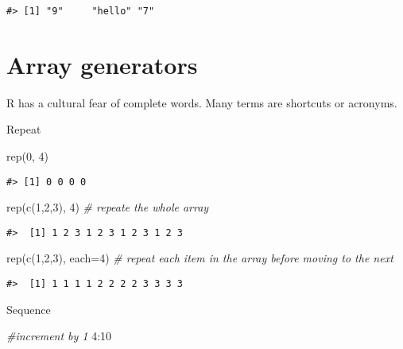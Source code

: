\documentclass[
]{book}
\newenvironment{Shaded}{\begin{snugshade}}{\end{snugshade}}
\newcommand{\AttributeTok}[1]{\textcolor[rgb]{0.77,0.63,0.00}{#1}}
\newcommand{\CommentTok}[1]{\textcolor[rgb]{0.56,0.35,0.01}{\textit{#1}}}
\newcommand{\DecValTok}[1]{\textcolor[rgb]{0.00,0.00,0.81}{#1}}
\newcommand{\FunctionTok}[1]{\textcolor[rgb]{0.00,0.00,0.00}{#1}}
\newcommand{\NormalTok}[1]{#1}
\newcommand{\SpecialCharTok}[1]{\textcolor[rgb]{0.00,0.00,0.00}{#1}}
\begin{document}
\begin{verbatim}
#> [1] "9"     "hello" "7"
\end{verbatim}

\hypertarget{array-generators}{%
\section{Array generators}\label{array-generators}}

R has a cultural fear of complete words. Many terms are shortcuts or acronyms.

Repeat

\begin{Shaded}
\begin{Highlighting}[]
\FunctionTok{rep}\NormalTok{(}\DecValTok{0}\NormalTok{, }\DecValTok{4}\NormalTok{)}
\end{Highlighting}
\end{Shaded}

\begin{verbatim}
#> [1] 0 0 0 0
\end{verbatim}

\begin{Shaded}
\begin{Highlighting}[]
\FunctionTok{rep}\NormalTok{(}\FunctionTok{c}\NormalTok{(}\DecValTok{1}\NormalTok{,}\DecValTok{2}\NormalTok{,}\DecValTok{3}\NormalTok{), }\DecValTok{4}\NormalTok{) }\CommentTok{\# repeate the whole array}
\end{Highlighting}
\end{Shaded}

\begin{verbatim}
#>  [1] 1 2 3 1 2 3 1 2 3 1 2 3
\end{verbatim}

\begin{Shaded}
\begin{Highlighting}[]
\FunctionTok{rep}\NormalTok{(}\FunctionTok{c}\NormalTok{(}\DecValTok{1}\NormalTok{,}\DecValTok{2}\NormalTok{,}\DecValTok{3}\NormalTok{), }\AttributeTok{each=}\DecValTok{4}\NormalTok{) }\CommentTok{\# repeat each item in the array before moving to the next}
\end{Highlighting}
\end{Shaded}

\begin{verbatim}
#>  [1] 1 1 1 1 2 2 2 2 3 3 3 3
\end{verbatim}

Sequence

\begin{Shaded}
\begin{Highlighting}[]
\CommentTok{\#increment by 1}
\DecValTok{4}\SpecialCharTok{:}\DecValTok{10}
\end{Highlighting}
\end{Shaded}
\end{document}
